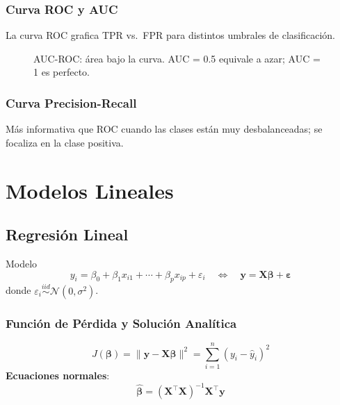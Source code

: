 \documentclass[12pt, a4paper]{article}
\begin{document}
\subsubsection{Curva ROC y AUC}
La curva ROC grafica TPR vs.\ FPR para distintos umbrales de clasificación.

\begin{figure}[H]
\centering
{}
\caption{AUC-ROC: área bajo la curva. AUC = 0.5 equivale a azar; AUC = 1 es perfecto.}
\end{figure}

\subsubsection{Curva Precision-Recall}
Más informativa que ROC cuando las clases están muy desbalanceadas; se focaliza en la
clase positiva.

\section{Modelos Lineales}

\subsection{Regresión Lineal}

\begin{defbox}{Modelo}
\[
  y_i = \beta_0 + \beta_1 x_{i1} + \cdots + \beta_p x_{ip} + \varepsilon_i
  \quad\Longleftrightarrow\quad \mathbf{y} = \mathbf{X}\bm{\beta} + \bm{\varepsilon}
\]
donde $\varepsilon_i \overset{iid}{\sim} \mathcal{N}(0,\sigma^2)$.
\end{defbox}

\subsubsection{Función de Pérdida y Solución Analítica}
\[
  J(\bm{\beta}) = \|\mathbf{y} - \mathbf{X}\bm{\beta}\|^2
  = \sum_{i=1}^{n}(y_i - \hat{y}_i)^2
\]
\textbf{Ecuaciones normales}:
\[
  \boxed{\hat{\bm{\beta}} = (\mathbf{X}^\top \mathbf{X})^{-1}\mathbf{X}^\top\mathbf{y}}
\]
\end{document}
